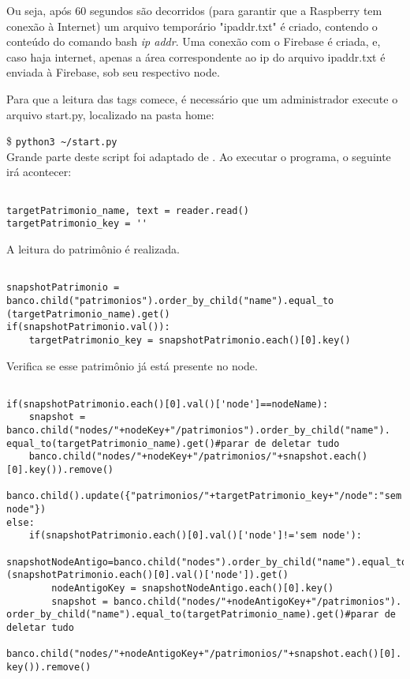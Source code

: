 \documentclass[
	12pt,				%
	openright,			%
	oneside,			%
	a4paper,			%
	english,			%
	french,				%
	spanish,			%
	brazil				%
	]{abntex2}
\begin{document}
Ou seja, após 60 segundos são decorridos (para garantir que a Raspberry tem conexão à Internet) um arquivo temporário "ipaddr.txt" é criado, contendo o conteúdo do comando bash \emph{ip addr}. Uma conexão com o Firebase é criada, e, caso haja internet, apenas a área correspondente ao ip do arquivo ipaddr.txt é enviada à Firebase, sob seu respectivo node. 

Para que a leitura das tags comece, é necessário que um administrador execute o arquivo start.py, localizado na pasta home:

{\tiny\$} \lstinline$python3 ~/start.py$\\

Grande parte deste script foi adaptado de \citeauthor{pimylifeuprfid}. Ao executar o programa, o seguinte irá acontecer:

\begin{lstlisting}

targetPatrimonio_name, text = reader.read()
targetPatrimonio_key = ''
\end{lstlisting}

A leitura do patrimônio é realizada.

\begin{lstlisting}
	
snapshotPatrimonio = banco.child("patrimonios").order_by_child("name").equal_to
(targetPatrimonio_name).get()
if(snapshotPatrimonio.val()):
	targetPatrimonio_key = snapshotPatrimonio.each()[0].key()
\end{lstlisting}

Verifica se esse patrimônio já está presente no node.

\begin{lstlisting}
	
if(snapshotPatrimonio.each()[0].val()['node']==nodeName):
	snapshot = banco.child("nodes/"+nodeKey+"/patrimonios").order_by_child("name").
equal_to(targetPatrimonio_name).get()#parar de deletar tudo
	banco.child("nodes/"+nodeKey+"/patrimonios/"+snapshot.each()[0].key()).remove()
	banco.child().update({"patrimonios/"+targetPatrimonio_key+"/node":"sem node"})
else:
	if(snapshotPatrimonio.each()[0].val()['node']!='sem node'):
		snapshotNodeAntigo=banco.child("nodes").order_by_child("name").equal_to
(snapshotPatrimonio.each()[0].val()['node']).get()
		nodeAntigoKey = snapshotNodeAntigo.each()[0].key()
		snapshot = banco.child("nodes/"+nodeAntigoKey+"/patrimonios").
order_by_child("name").equal_to(targetPatrimonio_name).get()#parar de deletar tudo
		banco.child("nodes/"+nodeAntigoKey+"/patrimonios/"+snapshot.each()[0].
key()).remove()
\end{lstlisting}
\end{document}
